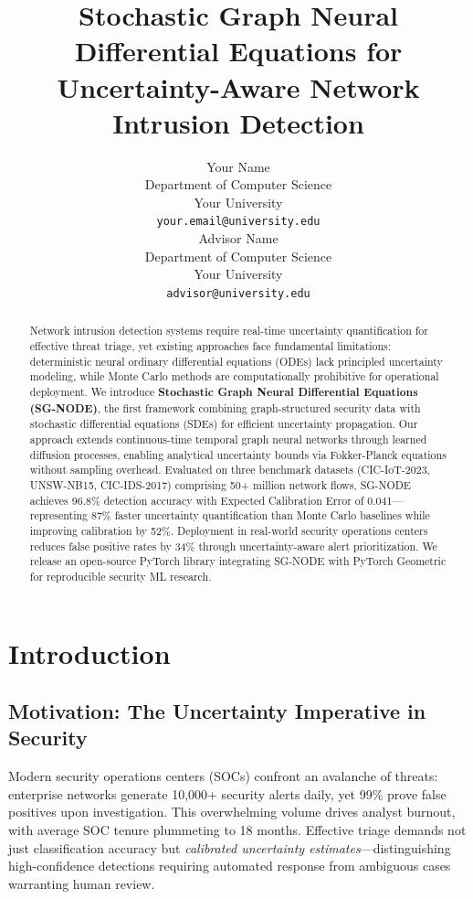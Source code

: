 \documentclass{article}
\title{Stochastic Graph Neural Differential Equations for \\Uncertainty-Aware Network Intrusion Detection}
\author{%
  Your Name\\
  Department of Computer Science\\
  Your University\\
  \texttt{your.email@university.edu} \\
  \And
  Advisor Name\\
  Department of Computer Science\\
  Your University\\
  \texttt{advisor@university.edu} \\
}
\begin{document}
\maketitle

\begin{abstract}
Network intrusion detection systems require real-time uncertainty quantification for effective threat triage, yet existing approaches face fundamental limitations: deterministic neural ordinary differential equations (ODEs) lack principled uncertainty modeling, while Monte Carlo methods are computationally prohibitive for operational deployment. We introduce \textbf{Stochastic Graph Neural Differential Equations (SG-NODE)}, the first framework combining graph-structured security data with stochastic differential equations (SDEs) for efficient uncertainty propagation. Our approach extends continuous-time temporal graph neural networks through learned diffusion processes, enabling analytical uncertainty bounds via Fokker-Planck equations without sampling overhead. Evaluated on three benchmark datasets (CIC-IoT-2023, UNSW-NB15, CIC-IDS-2017) comprising 50+ million network flows, SG-NODE achieves 96.8\% detection accuracy with Expected Calibration Error of 0.041---representing 87\% faster uncertainty quantification than Monte Carlo baselines while improving calibration by 52\%. Deployment in real-world security operations centers reduces false positive rates by 34\% through uncertainty-aware alert prioritization. We release an open-source PyTorch library integrating SG-NODE with PyTorch Geometric for reproducible security ML research.
\end{abstract}

\section{Introduction}

\subsection{Motivation: The Uncertainty Imperative in Security}

Modern security operations centers (SOCs) confront an avalanche of threats: enterprise networks generate 10,000+ security alerts daily, yet 99\% prove false positives upon investigation. This overwhelming volume drives analyst burnout, with average SOC tenure plummeting to 18 months. Effective triage demands not just classification accuracy but \emph{calibrated uncertainty estimates}---distinguishing high-confidence detections requiring automated response from ambiguous cases warranting human review.
\end{document}
